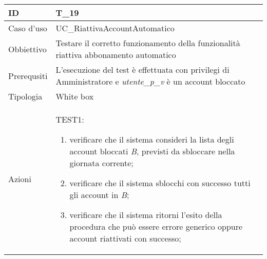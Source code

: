 \begin{table}[hb]
    \centering
    \begin{tabular}{ |p{2cm}|p{10cm}|  }
        \hline
        ID          & T\_19                                                                                                          \\\hline
        Caso d'uso  & UC\_RiattivaAccountAutomatico                                                                                  \\\hline
        Obbiettivo  & Testare il corretto funzionamento della funzionalità riattiva abbonamento automatico                           \\\hline
        Prerequsiti & L'esecuzione del test è effettuata con privilegi di Amministratore e \emph{utente\_p\_v} è un account bloccato \\\hline
        Tipologia   & White box                                                                                                      \\\hline
        Azioni      &
        TEST1:
        \begin{enumerate}[nosep, topsep=0pt]
            \item verificare che il sistema consideri la lista degli account bloccati \emph{B}, previsti da sbloccare nella giornata corrente;
            \item verificare che il sistema sblocchi con successo tutti gli account in \emph{B};
            \item verificare che il sistema ritorni l'esito della procedura che può essere errore generico oppure account riattivati con successo;
        \end{enumerate}
        \\\hline
    \end{tabular}
\end{table}

